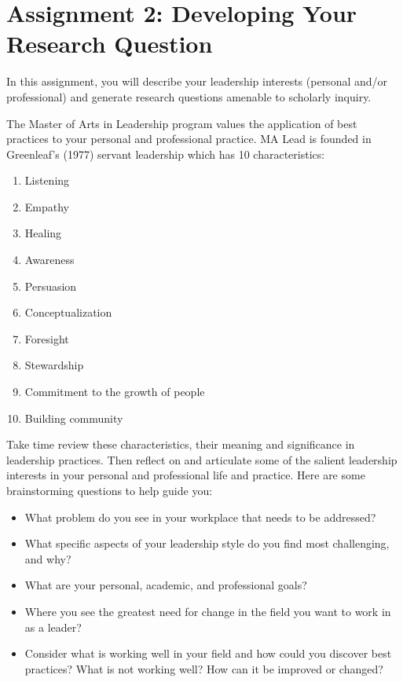\documentclass[
  letterpaper,
  DIV=11,
  numbers=noendperiod]{scrreprt}
\providecommand{\tightlist}{%
  \setlength{\itemsep}{0pt}\setlength{\parskip}{0pt}}\usepackage{longtable,booktabs,array}
\begin{document}

\chapter{Assignment 2: Developing Your Research
Question}\label{assignment-2-developing-your-research-question}

In this assignment, you will describe your leadership interests
(personal and/or professional) and generate research questions amenable
to scholarly inquiry.

The Master of Arts in Leadership program values the application of best
practices to your personal and professional practice. MA Lead is founded
in Greenleaf's (1977) servant leadership which has 10 characteristics:

\begin{enumerate}
\def\labelenumi{\arabic{enumi}.}
\tightlist
\item
  Listening
\item
  Empathy
\item
  Healing
\item
  Awareness
\item
  Persuasion
\item
  Conceptualization
\item
  Foresight
\item
  Stewardship
\item
  Commitment to the growth of people
\item
  Building community
\end{enumerate}

Take time review these characteristics, their meaning and significance
in leadership practices. Then reflect on and articulate some of the
salient leadership interests in your personal and professional life and
practice. Here are some brainstorming questions to help guide you:

\begin{itemize}
\tightlist
\item
  What problem do you see in your workplace that needs to be addressed?
\item
  What specific aspects of your leadership style do you find most
  challenging, and why?
\item
  What are your personal, academic, and professional goals?
\item
  Where you see the greatest need for change in the field you want to
  work in as a leader?
\item
  Consider what is working well in your field and how could you discover
  best practices? What is not working well? How can it be improved or
  changed?
\end{itemize}
\end{document}
